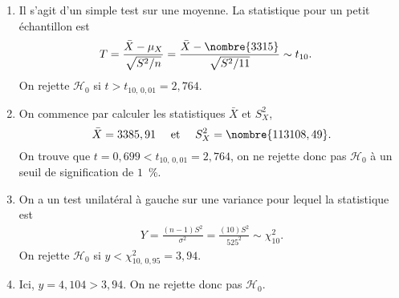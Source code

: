 \begin{solution}{6.5}
   \begin{enumerate}
   \item Il s'agit d'un simple test sur une moyenne. La statistique
      pour un petit échantillon est
      \begin{align*}
        T &= \frac{\bar{X} - \mu_X}{\sqrt{S^2/n}} = \frac{\bar{X} - \nombre{3315}}{\sqrt{S^2/11}} \sim t_{10}.
      \end{align*}
      On rejette $ \mathcal{H}_0$ si $t > t_{10, \,0,01} = 2,764$.
   \item On commence par calculer les statistiques $\bar{X}$ et $S_X^2$,
   $$
   \bar{X} = 3385,91 \quad \mbox{ et } \quad S_X^2 = \nombre{113108,49}.
   $$
   On trouve que $t = 0,699 < t_{10, \,0,01} = 2,764$, on ne rejette donc pas $ \mathcal{H}_0$ à un seuil de signification de $1$~\%.

    \item On a un test unilatéral à gauche sur une variance pour lequel la statistique est
      \begin{align*}
        Y = \frac{(n-1) S^2}{\sigma^2} = \frac{(10) S^2}{525^2} \sim \chi^2_{10}.
      \end{align*}
      On rejette $ \mathcal{H}_0$ si $y < \chi_{10, \, 0,95}^2 = 3,94$.
    \item Ici, $y = 4,104 > 3,94$. On ne rejette donc pas $ \mathcal{H}_0$.
    \end{enumerate}
  
\end{solution}
